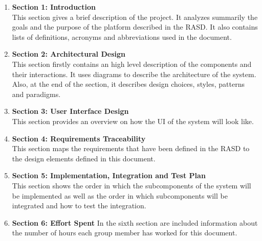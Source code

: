 \begin{enumerate}
    \item \textbf{Section 1: Introduction} \\
    This section gives a brief description of the project. It analyzes summarily the goals and the purpose of the platform described in the RASD. It also contains lists of definitions, acronyms and abbreviations used in the document.  
    \item \textbf{Section 2: Architectural Design} \\
    This section firstly contains an high level description of the components and their interactions. It uses diagrams to describe the architecture of the system. Also, at the end of the section, it describes design choices, styles, patterns and paradigms.
    \item \textbf{Section 3: User Interface Design} \\
    This section provides an overview on how the UI of the system will look like.
    \item \textbf{Section 4: Requirements Traceability} \\
    This section maps the requirements that have been defined in the RASD to the design elements defined in this document.
    \item \textbf{Section 5: Implementation, Integration and Test Plan} \\
    This section shows the order in which the subcomponents of the system will be implemented as well as the order in which subcomponents will be integrated and how to test the integration.
    \item \textbf{Section 6: Effort Spent} In the sixth section are included information about the number of hours each group member has worked for this document.
\end{enumerate}